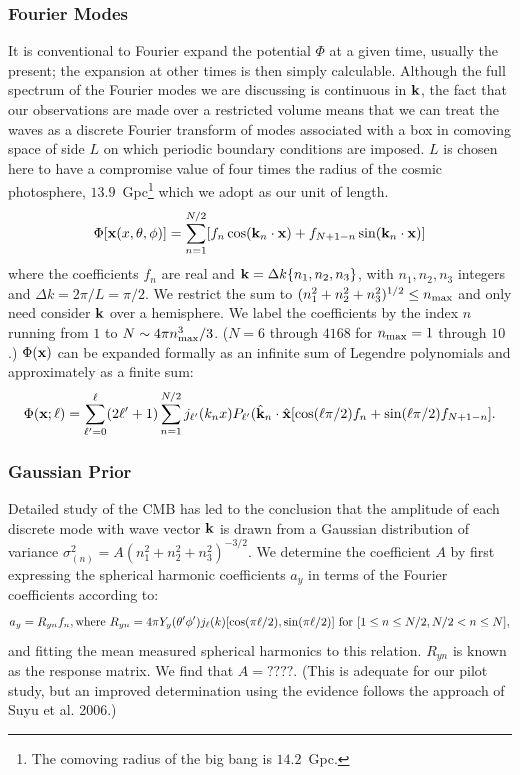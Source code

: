 \documentclass[psfig,11pt]{article}
\begin{document}
\subsubsection{Fourier Modes}
It is conventional to Fourier expand the potential $\Phi$ at a given time, usually the present; the expansion at other times is then simply calculable. Although the full spectrum of the Fourier modes we are discussing is continuous in ${\bf k}$, the fact that our observations are made over a restricted volume means that we can treat the waves as a discrete Fourier transform of modes associated with a box in comoving space of side $L$ on which periodic boundary conditions are imposed. $L$ is chosen here to have a compromise value of four times the radius of the cosmic photosphere, $13.9$~Gpc\footnote{The comoving radius of the big bang is $14.2$~Gpc.} which we adopt as our unit of length.
\begin{equation}
\Phi[{\bf x}(x,\theta,\phi)]=\sum_{n=1}^{N/2}[f_n\cos({\bf k}_n\cdot{\bf x})+f_{N+1-n}\sin({\bf k}_n\cdot{\bf x})]
\end{equation}
where the coefficients $f_n$ are real and ${\bf k}=\Delta k\{n_1,n_2,n_3\}$, with $n_1,n_2,n_3$ integers and $\Delta k=2\pi/L=\pi/2$.  We restrict the sum to $(n_1^2+n_2^2+n_3^2)^{1/2}\le n_{\rm max}$ and only need consider $\bf k$ over a hemisphere. We label the coefficients by the index $n$ running from $1$ to $N\sim4\pi n_{\rm max}^3/3$. ($N=6$ through $4168$ for $n_{\rm max}=1$ through $10$.) $\Phi({\bf x})$ can be expanded formally as an infinite sum of Legendre polynomials and approximately as a finite sum:
\begin{equation}
\Phi({\bf x;\ell})=\sum_{\ell'=0} ^\ell(2\ell'+1)\sum_{n=1}^{N/2}j_{\ell'}(k_nx)P_{\ell'}({\hat{\bf k}}_n\cdot{\hat{\bf x}}[\cos(\ell\pi/2)f_n+\sin(\ell\pi/2)f_{N+1-n}].
\end{equation}

\subsubsection{Gaussian Prior}
Detailed study of the CMB has led to the conclusion that the amplitude of each discrete mode with wave vector $\bf k$ is drawn from a Gaussian distribution of variance $\sigma_{(n)}^2=A(n_1^2+n_2^2+n_3^2)^{-3/2}$. We determine the coefficient $A$ by first expressing the spherical harmonic coefficients $a_y$ in terms of the Fourier coefficients according to:
\begin{equation}
a_y=R_{yn}f_n, {\rm where}\ R_{yn}=4\pi Y_y(\theta'\phi')j_\ell(k)[\cos(\pi\ell/2),\sin(\pi\ell/2)]\ {\rm for}\ [1\le n\le N/2,N/2<n\le N],
\end{equation}
and fitting the mean measured spherical harmonics to this relation. $R_{yn}$ is known as the response matrix. We find that $A=????$. (This is adequate for our pilot study, but an improved determination using the evidence follows the approach of Suyu et al. 2006.)
\end{document}

